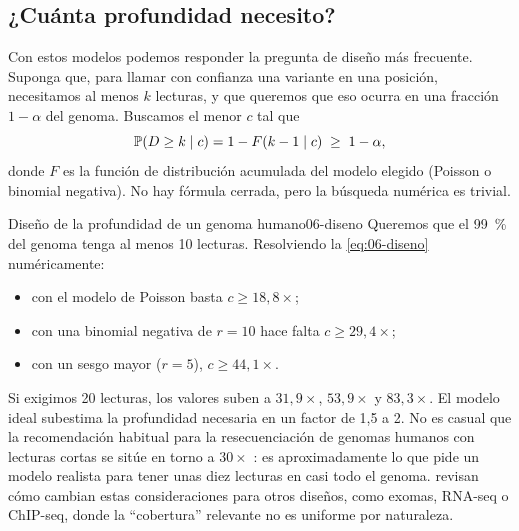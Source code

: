 \subsection{¿Cuánta profundidad necesito?}

Con estos modelos podemos responder la pregunta de diseño más frecuente. Suponga que, para llamar con confianza una variante en una posición, necesitamos al menos $k$ lecturas, y que queremos que eso ocurra en una fracción $1-\alpha$ del genoma. Buscamos el menor $c$ tal que
\begin{equation}\label{eq:06-diseno}
\mathbb{P}(D \ge k \mid c) = 1-F(k-1\mid c) \;\ge\; 1-\alpha,
\end{equation}
donde $F$ es la función de distribución acumulada del modelo elegido (Poisson o binomial negativa). No hay fórmula cerrada, pero la búsqueda numérica es trivial.

\begin{simbolos}
\end{simbolos}

\begin{ejemplo}{Diseño de la profundidad de un genoma humano}{06-diseno}
Queremos que el \SI{99}{\percent} del genoma tenga al menos 10 lecturas. Resolviendo la \cref{eq:06-diseno} numéricamente:
\begin{itemize}
  \item con el modelo de Poisson basta $c\ge18{,}8\times$;
  \item con una binomial negativa de $r=10$ hace falta $c\ge29{,}4\times$;
  \item con un sesgo mayor ($r=5$), $c\ge44{,}1\times$.
\end{itemize}
Si exigimos 20 lecturas, los valores suben a $31{,}9\times$, $53{,}9\times$ y $83{,}3\times$. El modelo ideal subestima la profundidad necesaria en un factor de 1,5 a 2. No es casual que la recomendación habitual para la resecuenciación de genomas humanos con lecturas cortas se sitúe en torno a $30\times$ \parencite{c06-bentley2008,c06-sims2014}: es aproximadamente lo que pide un modelo realista para tener unas diez lecturas en casi todo el genoma. \textcite{c06-sims2014} revisan cómo cambian estas consideraciones para otros diseños, como exomas, RNA-seq o ChIP-seq, donde la ``cobertura'' relevante no es uniforme por naturaleza.
\end{ejemplo}


